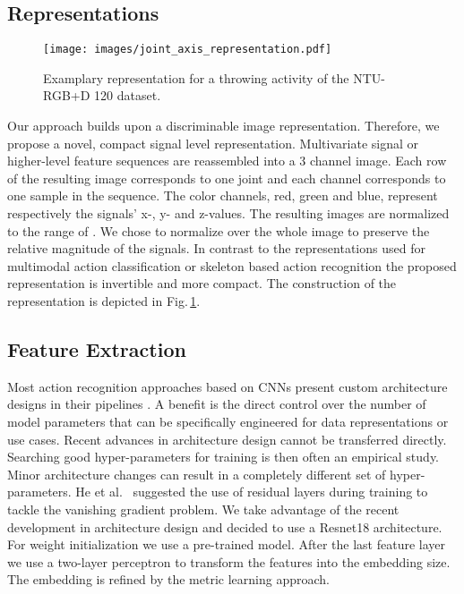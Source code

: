 \documentclass[10pt,conference,a4paper]{IEEEtran}
\def\andothers{et al.\ }
\def\figname{Fig.\,}
\begin{document}
\subsection{Representations}    
\begin{figure}
    \centering
    \texttt{[image: images/joint\_axis\_representation.pdf]}
    \caption{Examplary representation for a throwing activity of the NTU-RGB+D 120 dataset.}
    \label{fig:representation_example}
\end{figure}
Our approach builds upon a discriminable image representation. Therefore, we propose a novel, compact signal level representation. Multivariate signal or higher-level feature sequences are reassembled into a 3 channel image. Each row of the resulting image corresponds to one joint and each channel corresponds to one sample in the sequence. The color channels, red, green and blue, represent respectively the signals' x-, y- and z-values. The resulting images are normalized to the range of . We chose to normalize over the whole image to preserve the relative magnitude of the signals. In contrast to the representations used for multimodal action classification \cite{memmesheimer2020gimme} or skeleton based action recognition \cite{wang2018action,liu2017enhanced} the proposed representation is invertible and more compact. The construction of the representation is depicted in \figname \ref{fig:representation_example}.




\subsection{Feature Extraction}

Most action recognition approaches based on CNNs present custom architecture designs in their pipelines \cite{liu2017enhanced}. A benefit is the direct control over the number of model parameters that can be specifically engineered for data representations or use cases. Recent advances in architecture design cannot be transferred directly. Searching good hyper-parameters for training is then often an empirical study. Minor architecture changes can result in a completely different set of hyper-parameters.
He \andothers \cite{he2016deep} suggested the use of residual layers during training to tackle the vanishing gradient problem. We take advantage of the recent development in architecture design and decided to use a Resnet18 \cite{he2016deep} architecture. For weight initialization we use a pre-trained model. 
After the last feature layer we use a two-layer perceptron to transform the features into the embedding size. The embedding is refined by the metric learning approach.
\end{document}
